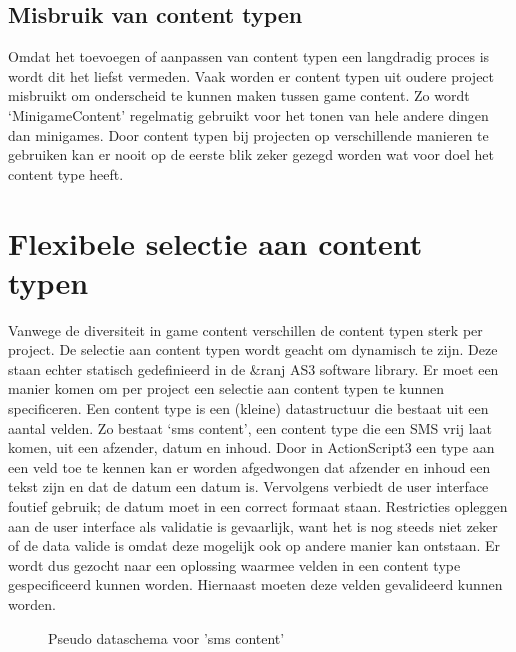 \subsection{Misbruik van content typen}
Omdat het toevoegen of aanpassen van content typen een langdradig proces is wordt dit het liefst vermeden. Vaak worden er content typen uit oudere project misbruikt om onderscheid te kunnen maken tussen game content. Zo wordt ‘MinigameContent’ regelmatig gebruikt voor het tonen van hele andere dingen dan minigames.
Door content typen bij projecten op verschillende manieren te gebruiken kan er nooit op de eerste blik zeker gezegd worden wat voor doel het content type heeft.

\section{Flexibele selectie aan content typen}
Vanwege de diversiteit in game content verschillen de content typen sterk per project. De selectie aan content typen wordt geacht om dynamisch te zijn. Deze staan echter statisch gedefinieerd in de \&ranj AS3 software library. Er moet een manier komen om per project een selectie aan content typen te kunnen specificeren.
Een content type is een (kleine) datastructuur die bestaat uit een aantal velden. Zo bestaat ‘sms content’, een content type die een SMS vrij laat komen, uit een afzender, datum en inhoud. Door in ActionScript3 een type aan een veld toe te kennen kan er worden afgedwongen dat afzender en inhoud een tekst zijn en dat de datum een datum is. Vervolgens verbiedt de user interface foutief gebruik; de datum moet in een correct formaat staan. Restricties opleggen aan de user interface als validatie is gevaarlijk, want het is nog steeds niet zeker of de data valide is omdat deze mogelijk ook op andere manier kan ontstaan. Er wordt dus gezocht naar een oplossing waarmee velden in een content type gespecificeerd kunnen worden. Hiernaast moeten deze velden gevalideerd kunnen worden.

\begin{wrapfigure}{r}{0.5\textwidth}
    \caption{Pseudo dataschema voor 'sms content'}
    \label{fig:pseudosmscontent}
\end{wrapfigure}

